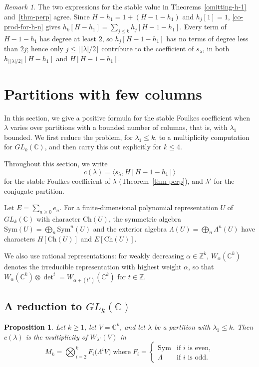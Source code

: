 \documentclass[reqno]{amsart}
\theoremstyle{plain}
\newtheorem{proposition}[theorem]{Proposition}
\theoremstyle{definition}
\theoremstyle{remark}
\newtheorem{remark}[theorem]{Remark}
\theoremstyle{plain}
\newcommand{\C}{\mathbb{C}}
\newcommand{\Z}{\mathbb{Z}}
\begin{document}
\begin{remark}
The two expressions for the stable value in Theorems~\ref{omitting-h-1}
and~\ref{thm-perp} agree. Since $H-h_1=1+(H-1-h_1)$ and $h_j[1]=1$,
\eqref{co-prod-for-h-n} gives $h_k[H-h_1]=\sum_{j\le k}h_j[H-1-h_1]$. Every
term of $H-1-h_1$ has degree at least $2$, so $h_j[H-1-h_1]$ has no terms of
degree less than $2j$; hence only $j\le\lfloor|\lambda|/2\rfloor$ contribute to
the coefficient of $s_\lambda$, in both $h_{\lfloor|\lambda|/2\rfloor}[H-h_1]$
and $H[H-1-h_1]$.
\end{remark}

\section{Partitions with few columns}\label{sec-few-columns}

In this section, we give a positive formula for the stable Foulkes
coefficient when $\lambda$ varies over partitions with a bounded number of
columns, that is, with $\lambda_1$ bounded. We first reduce the problem, for
$\lambda_1\le k$, to a multiplicity computation for $GL_k(\C)$, and then carry
this out explicitly for $k\le4$.

\smallskip
Throughout this section, we write
$$c(\lambda)=\langle s_\lambda,H[H-1-h_1]\rangle$$
for the stable Foulkes coefficient of $\lambda$ (Theorem~\ref{thm-perp}), and
$\lambda'$ for the conjugate partition.

\smallskip
Let $E=\sum_{n\ge0}e_n$. For a
finite-dimensional polynomial representation $U$ of $GL_k(\C)$ with character
$\mathrm{Ch}(U)$, the symmetric algebra $\mathrm{Sym}(U)=\bigoplus_n\mathrm{Sym}^n(U)$
and the exterior algebra $\Lambda(U)=\bigoplus_n\Lambda^n(U)$ have characters
$H[\mathrm{Ch}(U)]$ and $E[\mathrm{Ch}(U)]$.

\smallskip
We also use rational
representations: for weakly decreasing $\alpha\in\Z^k$, $W_\alpha(\C^k)$
denotes the irreducible representation with highest weight $\alpha$, so that
$W_\alpha(\C^k)\otimes{\det}^t=W_{\alpha+(t^k)}(\C^k)$ for $t\in\Z$.

\subsection{A reduction to \texorpdfstring{$GL_k(\C)$}{GLk(C)}}

\begin{proposition}\label{prop-reduction}
Let $k\ge1$, let $V=\C^k$, and let $\lambda$ be a partition with
$\lambda_1\le k$. Then $c(\lambda)$ is the multiplicity of $W_{\lambda'}(V)$ in
$$M_k=\bigotimes_{i=2}^{k}F_i\big(\Lambda^iV\big)\;\text{where}\;
F_i=\begin{cases}\mathrm{Sym}&\text{if } i \text{ is even},\\ \Lambda&\text{if } i\text{ is odd}.\end{cases}$$
\end{proposition}
\end{document}
